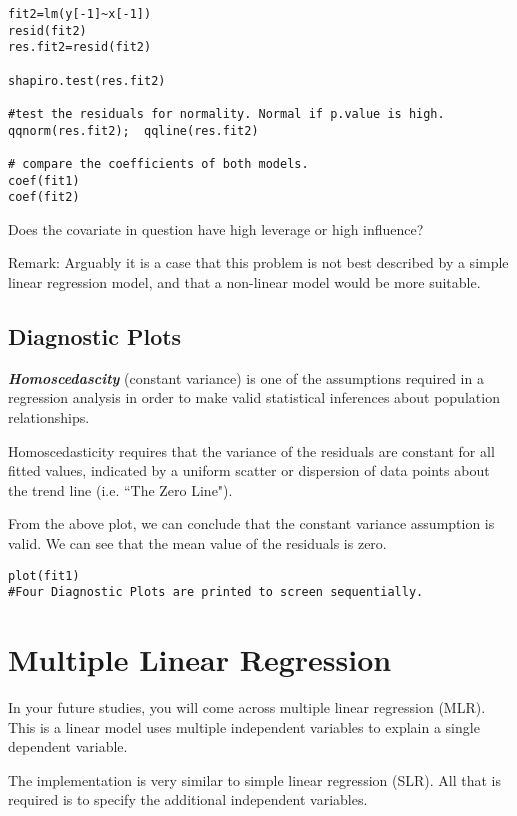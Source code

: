 \documentclass[a4paper,12pt]{article}
\begin{document}
\begin{framed}
\begin{verbatim}
fit2=lm(y[-1]~x[-1])
resid(fit2)
res.fit2=resid(fit2)

shapiro.test(res.fit2)			

#test the residuals for normality. Normal if p.value is high.
qqnorm(res.fit2);  qqline(res.fit2)			

# compare the coefficients of both models.
coef(fit1)
coef(fit2)

\end{verbatim}
\end{framed}
Does the covariate in question have high leverage or high influence?


Remark: Arguably it is a case that this problem is not best described by a simple linear regression model, and that a non-linear model would be more suitable.

\subsection{Diagnostic Plots}
\textbf{\emph{Homoscedascity }}(constant variance) is one of the assumptions required in a regression analysis in order to make valid statistical inferences about population relationships.

Homoscedasticity requires that the variance of the residuals are constant for all fitted values, indicated by a uniform scatter or dispersion of data points about the trend line (i.e. ``The Zero Line").

From the above plot, we can conclude that the constant variance assumption is valid. We can see that the mean value of the residuals is zero.
\begin{framed}
\begin{verbatim}
plot(fit1)
#Four Diagnostic Plots are printed to screen sequentially.
\end{verbatim}
\end{framed}
\newpage
\section{Multiple Linear Regression}
In your future studies, you will come across multiple linear regression (MLR). This is a linear model uses multiple independent variables to explain a single dependent variable.

The implementation is very similar to simple linear regression (SLR). All that is required is to specify the additional independent variables.
\end{document}
